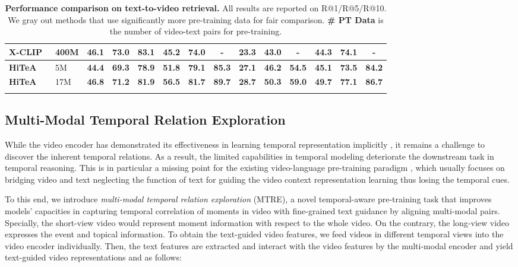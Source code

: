 \documentclass[10pt,twocolumn,letterpaper]{article}
\newcommand{\demph}[1]{\textcolor{demphcolor}{#1}}
\newlength\savewidth
\newcommand\shline{\noalign{\global\savewidth\arrayrulewidth\global\arrayrulewidth 1pt}\hline\noalign{\global\arrayrulewidth\savewidth}}
\newcommand{\modelname}{\textbf{HiTeA}\xspace}
\begin{document}
\begin{table*}[t!]
{\begin{tabular}{ll|ccc|ccc|ccc|ccc}
        \demph{X-CLIP~\cite{ma2022xclip}} & \demph{400M} &  \demph{46.1} & \demph{73.0} & \demph{83.1} & \demph{45.2} & \demph{74.0} & \demph{-}  & \demph{23.3} & \demph{43.0} & \demph{-} & \demph{44.3} & \demph{74.1} & \demph{-} \\
        \hline
        \modelname & 5M & \textbf{44.4} & \textbf{69.3} & \textbf{78.9} & \textbf{51.8} & \textbf{79.1} & \textbf{85.3} &  \textbf{27.1} & \textbf{46.2} & \textbf{54.5} & \textbf{45.1} & \textbf{73.5} & \textbf{84.2} \\
        \demph{\modelname} & \demph{17M} & \demph{\textbf{46.8}} & \demph{\textbf{71.2}} & \demph{\textbf{81.9}} & \demph{\textbf{56.5}} & \demph{\textbf{81.7}} & \demph{\textbf{89.7}} &  \demph{\textbf{28.7}} & \demph{\textbf{50.3}} & \demph{\textbf{59.0}} & \demph{\textbf{49.7}} & \demph{\textbf{77.1}} & \demph{\textbf{86.7}} \\
        \shline
\end{tabular}
    }
    \vspace{-1ex}
    \caption{\textbf{Performance comparison on text-to-video retrieval.} All results are reported on R@1/R@5/R@10. We gray out methods that use significantly more pre-training data for fair comparison. \textbf{\# PT Data} is the number of video-text pairs for pre-training. 
    }
    \label{table:retrieval-sota}
    \vspace{-2ex}
\end{table*}
 
\subsection{Multi-Modal Temporal Relation Exploration}
\label{sec:mtre}
While the video encoder has demonstrated its effectiveness in learning temporal representation implicitly \cite{fu2021violet, li2022alpro, ye2021temporal}, it remains a challenge to discover the inherent temporal relations. As a result, the limited capabilities in temporal modeling deteriorate the downstream task in temporal reasoning. This is in particular a missing point for the existing video-language pre-training paradigm \cite{lei2021clipbert,li2022alpro, ge2022bridgeformer, li2022lavender}, which usually focuses on bridging video and text neglecting the function of text for guiding the video context representation learning thus losing the temporal cues. 

To this end, we introduce \textit{multi-modal temporal relation exploration} (MTRE), a novel temporal-aware pre-training task that improves models' capacities in capturing temporal correlation of moments in video with fine-grained text guidance by aligning multi-modal pairs. Specially, the short-view video  would represent moment information with respect to the whole video. On the contrary, the long-view video  
expresses the event and topical information. To obtain the text-guided video features, we feed videos in different temporal views into the video encoder individually. Then, the text features are extracted and interact with the video features by the multi-modal encoder and yield text-guided video representations  and  as follows:
\end{document}
